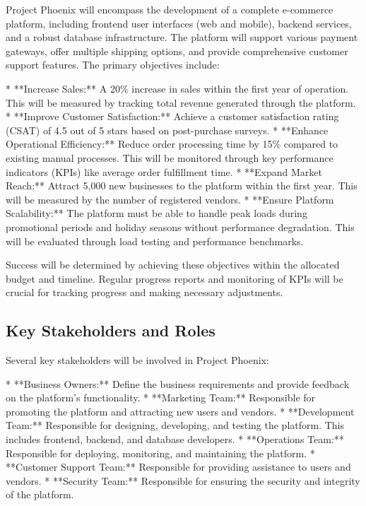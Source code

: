 \documentclass[11pt,a4paper,oneside]{article}
\begin{document}
Project Phoenix will encompass the development of a complete e-commerce platform, including frontend user interfaces (web and mobile), backend services, and a robust database infrastructure. The platform will support various payment gateways, offer multiple shipping options, and provide comprehensive customer support features.  The primary objectives include:

* **Increase Sales:**  A 20\% increase in sales within the first year of operation.  This will be measured by tracking total revenue generated through the platform.
* **Improve Customer Satisfaction:** Achieve a customer satisfaction rating (CSAT) of 4.5 out of 5 stars based on post-purchase surveys.
* **Enhance Operational Efficiency:** Reduce order processing time by 15\% compared to existing manual processes. This will be monitored through key performance indicators (KPIs) like average order fulfillment time.
* **Expand Market Reach:** Attract 5,000 new businesses to the platform within the first year.  This will be measured by the number of registered vendors.
* **Ensure Platform Scalability:** The platform must be able to handle peak loads during promotional periods and holiday seasons without performance degradation.  This will be evaluated through load testing and performance benchmarks.

Success will be determined by achieving these objectives within the allocated budget and timeline.  Regular progress reports and monitoring of KPIs will be crucial for tracking progress and making necessary adjustments.

\subsection{Key Stakeholders and Roles}

Several key stakeholders will be involved in Project Phoenix:

* **Business Owners:**  Define the business requirements and provide feedback on the platform's functionality.
* **Marketing Team:**  Responsible for promoting the platform and attracting new users and vendors.
* **Development Team:**  Responsible for designing, developing, and testing the platform.  This includes frontend, backend, and database developers.
* **Operations Team:**  Responsible for deploying, monitoring, and maintaining the platform.
* **Customer Support Team:**  Responsible for providing assistance to users and vendors.
* **Security Team:**  Responsible for ensuring the security and integrity of the platform.
\end{document}
